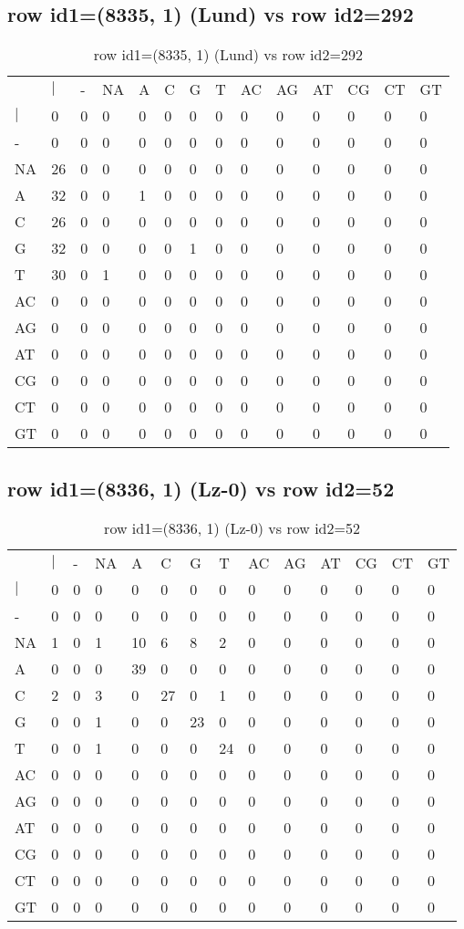 \subsection{row id1=(8335, 1) (Lund) vs row id2=292}
\begin{center}
\begin{longtable}{|l|l|l|l|l|l|l|l|l|l|l|l|l|l|}
\caption{row id1=(8335, 1) (Lund) vs row id2=292} \label{table_dm536}\\
\hline
\\
\hline
&$|$&-&NA&A&C&G&T&AC&AG&AT&CG&CT&GT\\
$|$&0&0&0&0&0&0&0&0&0&0&0&0&0\\
-&0&0&0&0&0&0&0&0&0&0&0&0&0\\
NA&26&0&0&0&0&0&0&0&0&0&0&0&0\\
A&32&0&0&1&0&0&0&0&0&0&0&0&0\\
C&26&0&0&0&0&0&0&0&0&0&0&0&0\\
G&32&0&0&0&0&1&0&0&0&0&0&0&0\\
T&30&0&1&0&0&0&0&0&0&0&0&0&0\\
AC&0&0&0&0&0&0&0&0&0&0&0&0&0\\
AG&0&0&0&0&0&0&0&0&0&0&0&0&0\\
AT&0&0&0&0&0&0&0&0&0&0&0&0&0\\
CG&0&0&0&0&0&0&0&0&0&0&0&0&0\\
CT&0&0&0&0&0&0&0&0&0&0&0&0&0\\
GT&0&0&0&0&0&0&0&0&0&0&0&0&0\\
\hline
\end{longtable}
\end{center}

\subsection{row id1=(8336, 1) (Lz-0) vs row id2=52}
\begin{center}
\begin{longtable}{|l|l|l|l|l|l|l|l|l|l|l|l|l|l|}
\caption{row id1=(8336, 1) (Lz-0) vs row id2=52} \label{table_dm538}\\
\hline
\\
\hline
&$|$&-&NA&A&C&G&T&AC&AG&AT&CG&CT&GT\\
$|$&0&0&0&0&0&0&0&0&0&0&0&0&0\\
-&0&0&0&0&0&0&0&0&0&0&0&0&0\\
NA&1&0&1&10&6&8&2&0&0&0&0&0&0\\
A&0&0&0&39&0&0&0&0&0&0&0&0&0\\
C&2&0&3&0&27&0&1&0&0&0&0&0&0\\
G&0&0&1&0&0&23&0&0&0&0&0&0&0\\
T&0&0&1&0&0&0&24&0&0&0&0&0&0\\
AC&0&0&0&0&0&0&0&0&0&0&0&0&0\\
AG&0&0&0&0&0&0&0&0&0&0&0&0&0\\
AT&0&0&0&0&0&0&0&0&0&0&0&0&0\\
CG&0&0&0&0&0&0&0&0&0&0&0&0&0\\
CT&0&0&0&0&0&0&0&0&0&0&0&0&0\\
GT&0&0&0&0&0&0&0&0&0&0&0&0&0\\
\hline
\end{longtable}
\end{center}

